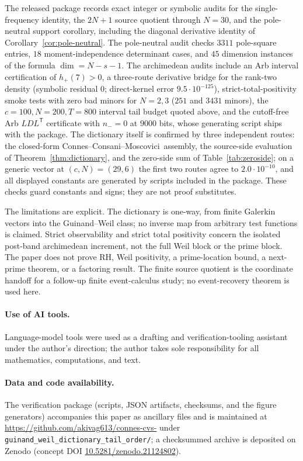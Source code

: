 \documentclass[11pt]{article}
\theoremstyle{plain}
\theoremstyle{definition}
\theoremstyle{remark}
\newcommand{\ccm}{Connes--Consani--Moscovici}
\begin{document}
The released package records exact integer or symbolic audits for the
single-frequency identity, the $2N{+}1$ source quotient through $N=30$, and the
pole-neutral support corollary, including the diagonal derivative identity of
Corollary~\ref{cor:pole-neutral}.  The pole-neutral audit checks $3311$
pole-square entries, $18$ moment-independence determinant cases, and $45$
dimension instances of the formula $\dim=N-s-1$.  The archimedean audits
include an Arb interval certification of $h_+(7)>0$, a three-route derivative
bridge for the rank-two density (symbolic residual $0$; direct-kernel error
$9.5\cdot10^{-125}$), strict-total-positivity smoke tests with zero bad
minors for $N=2,3$ ($251$ and $3431$ minors), the $c=100,N=200,T=800$
interval tail budget quoted above, and the cutoff-free Arb
$LDL^{\mathsf T}$ certificate with $n_-=0$ at $9000$ bits, whose generating
script ships with the package.  The dictionary itself is confirmed by three
independent routes: the closed-form \ccm\ assembly, the source-side
evaluation of Theorem~\ref{thm:dictionary}, and the zero-side sum of
Table~\ref{tab:zeroside}; on a generic vector at $(c,N)=(29,6)$ the first two
routes agree to $2.0\cdot10^{-10}$, and all displayed constants are generated
by scripts included in the package.  These checks guard constants and signs;
they are not proof substitutes.

The limitations are explicit.  The dictionary is one-way, from finite
Galerkin vectors into the Guinand--Weil class; no inverse map from arbitrary
test functions is claimed.  Strict observability and strict total positivity
concern the isolated post-band archimedean increment, not the full Weil
block or the prime block.  The paper does not prove
RH, Weil positivity, a prime-location bound, a next-prime theorem, or a
factoring result.  The finite source quotient is the coordinate handoff for a
follow-up finite event-calculus study; no event-recovery theorem is used
here.

\paragraph{Use of AI tools.}
Language-model tools were used as a drafting and verification-tooling
assistant under the author's direction; the author takes sole responsibility
for all mathematics, computations, and text.

\paragraph{Data and code availability.}
The verification package (scripts, JSON artifacts, checksums, and the figure
generators) accompanies this paper as ancillary files and is maintained at
\url{https://github.com/akivag613/connes-cvs-} under
\texttt{guinand\_weil\_dictionary\_tail\_order/}; a checksummed archive is deposited on
Zenodo (concept DOI \href{https://doi.org/10.5281/zenodo.21124802}{10.5281/zenodo.21124802}).

{\small\raggedright


}
\end{document}
